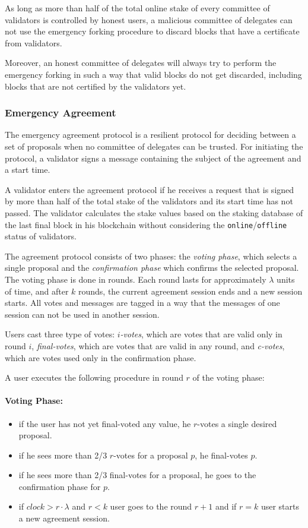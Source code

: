 As long as more than half of the total online stake of every committee of validators is controlled
by honest users, a malicious committee of delegates can not use the emergency forking procedure to discard blocks
that have a certificate from validators.

Moreover, an honest committee of delegates will always try to perform the emergency forking in such a way that
valid blocks do not get discarded, including blocks that are not certified by the validators yet.

\subsubsection{Emergency Agreement}

The emergency agreement protocol is a resilient protocol for deciding between a set of proposals when no committee of
delegates can be trusted. For initiating the protocol, a validator signs a message containing the subject
of the agreement and a start time.

A validator enters the agreement protocol if he
receives a request that is signed by more than half of the total stake
of the validators and its start time has not passed. The validator calculates
the stake values based on the staking database of the last final block in his blockchain without
considering the \texttt{online}/\texttt{offline} status of validators.

The agreement protocol consists of two phases: the \emph{voting phase}, which selects a single proposal
and the \emph{confirmation phase} which confirms the selected proposal. The voting phase is done in rounds.
Each round lasts for approximately $\lambda$ units of time, and after $k$ rounds, the current agreement session ends and a
new session starts. All votes and messages are tagged in a way that the messages of one session can
not be used in another session.

Users cast three type of votes: \emph{$i$-votes}, which are votes that are valid only in
round $i$, \emph{final-votes}, which are votes that are valid in any round, and \emph{c-votes}, which are votes
used only in the confirmation phase.

A user executes the following procedure
in round $r$ of the voting phase:
\paragraph{Voting Phase:}
\begin{itemize}
    \item if the user has not yet final-voted any value, he $r$-votes a single desired proposal.
    \item if he sees more than 2/3 $r$-votes for a proposal $p$, he final-votes $p$.
    \item if he sees more than 2/3 final-votes for a proposal, he goes to the confirmation phase for $p$.
    \item if $clock > r \cdot \lambda$ and $r < k$ user goes to the round $r + 1$ and if $r = k$ user starts a
    new agreement session.
\end{itemize}
